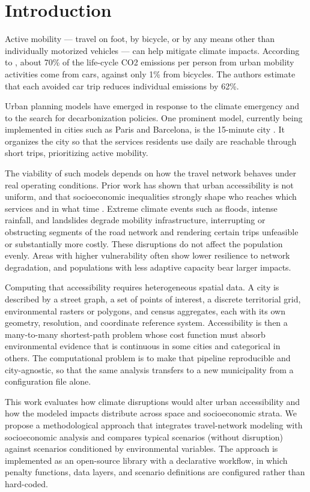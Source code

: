 \section{Introduction}

Active mobility — travel on foot, by bicycle, or by any means other than individually motorized vehicles — can help mitigate climate impacts. According to \cite{BRAND2021102764}, about 70\% of the life-cycle CO2 emissions per person from urban mobility activities come from cars, against only 1\% from bicycles. The authors estimate that each avoided car trip reduces individual emissions by 62\%.

Urban planning models have emerged in response to the climate emergency and to the search for decarbonization policies. One prominent model, currently being implemented in cities such as Paris and Barcelona, is the 15-minute city \cite{Allam2022-yx}. It organizes the city so that the services residents use daily are reachable through short trips, prioritizing active mobility.

The viability of such models depends on how the travel network behaves under real operating conditions. Prior work has shown that urban accessibility is not uniform, and that socioeconomic inequalities strongly shape who reaches which services and in what time \cite{sbbd_estendido}. Extreme climate events such as floods, intense rainfall, and landslides degrade mobility infrastructure, interrupting or obstructing segments of the road network and rendering certain trips unfeasible or substantially more costly. These disruptions do not affect the population evenly. Areas with higher vulnerability often show lower resilience to network degradation, and populations with less adaptive capacity bear larger impacts.

Computing that accessibility requires heterogeneous spatial data. A city is described by a street graph, a set of points of interest, a discrete territorial grid, environmental rasters or polygons, and census aggregates, each with its own geometry, resolution, and coordinate reference system. Accessibility is then a many-to-many shortest-path problem whose cost function must absorb environmental evidence that is continuous in some cities and categorical in others. The computational problem is to make that pipeline reproducible and city-agnostic, so that the same analysis transfers to a new municipality from a configuration file alone.

This work evaluates how climate disruptions would alter urban accessibility and how the modeled impacts distribute across space and socioeconomic strata. We propose a methodological approach that integrates travel-network modeling with socioeconomic analysis and compares typical scenarios (without disruption) against scenarios conditioned by environmental variables. The approach is implemented as an open-source library with a declarative workflow, in which penalty functions, data layers, and scenario definitions are configured rather than hard-coded.

